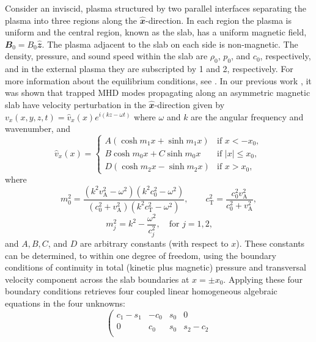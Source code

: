 \documentclass[namedreferences]{solarphysics}
\numberwithin{equation}{section}
\begin{document}
\begin{article}
Consider an inviscid, plasma structured by two parallel interfaces separating the plasma into three regions along the $\mathbfit{\widehat{x}}$-direction. In each region the plasma is uniform and the central region, known as the slab, has a uniform magnetic field, $\mathbfit{B_0} = B_0 \mathbfit{\widehat{z}}$. The plasma adjacent to the slab on each side is non-magnetic. The density, pressure, and sound speed within the slab are $\rho_0$, $p_0$, and $c_0$, respectively, and in the external plasma they are subscripted by 1 and 2, respectively. For more information about the equilibrium conditions, see \citealp{all_etal17}. In our previous work \citep{all_etal17}, it was shown that trapped MHD modes propagating along an asymmetric magnetic slab have velocity perturbation in the $\mathbfit{\widehat{x}}$-direction given by ${v_x(x,y,z,t) = \widehat{v}_x(x)e^{i(kz-\omega t)}}$ where $\omega$ and $k$ are the angular frequency and wavenumber, and
\begin{equation}
\widehat{v}_x(x)=
\begin{cases}
A(\cosh{m_1x}+\sinh{m_1x}) & \text{if }x<-x_0, \\
B\cosh{m_0x}+C\sinh{m_0x} & \text{if }|x|\leq{x_0}, \\
D(\cosh{m_2x}-\sinh{m_2x}) & \text{if  }x>x_0, \label{vsoln}
\end{cases}
\end{equation}
where
\begin{equation}
m_0^2=\frac{(k^2v_\textrm{A}^2-\omega^2)(k^2c_0^2-\omega^2)}{(c_0^2+v_\textrm{A}^2)(k^2c_\textrm{T}^2-\omega^2)}, \qquad c_\textrm{T}^2=\frac{c_0^2v_\textrm{A}^2}{c_0^2+v_\textrm{A}^2}, \label{m0}
\end{equation}
\begin{equation}
m_j^2=k^2-\frac{\omega^2}{c_j^2}, \quad \text{for $j=1,2$,} \label{m1/2}
\end{equation}
and $A, B, C$, and $D$ are arbitrary constants (with respect to $x$). These constants can be determined, to within one degree of freedom, using the boundary conditions of continuity in total (kinetic plus magnetic) pressure and transversal velocity component across the slab boundaries at $x = \pm x_0$. Applying these four boundary conditions retrieves four coupled linear homogeneous algebraic equations in the four unknowns:
\begin{equation}
\left(
\begin{matrix}
c_1-s_1 &-c_0                       &s_0                        &0 \\
0       &c_0                        &s_0                        &s_2-c_2 \\

\end{matrix}
\end{equation}
\end{article}
\end{document}
